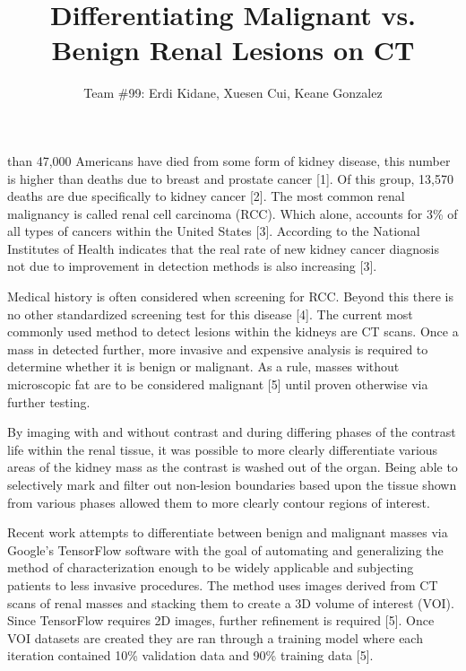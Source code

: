 \documentclass[10pt,journal,compsoc]{IEEEtran}
\begin{document}
\title{Differentiating Malignant vs. Benign Renal Lesions on CT}  %

\author{Team \#99: Erdi Kidane,
                Xuesen Cui,
                Keane Gonzalez}  %

\maketitle


\IEEEPARstartMore than 47,000 Americans have died from some form of kidney disease, this number is higher than deaths due to breast and prostate cancer [1]. Of this group, 13,570 deaths are due specifically to kidney cancer [2].  The most common renal malignancy is called renal cell carcinoma (RCC).  Which alone, accounts for 3\% of all types of cancers within the United States [3]. According to the National Institutes of Health indicates that the real rate of new kidney cancer diagnosis not due to improvement in detection methods is also increasing [3].   

Medical history is often considered when screening for RCC.  Beyond this there is no other standardized screening test for this disease [4].  The current most commonly used method to detect lesions within the kidneys are CT scans.  Once a mass in detected further, more invasive and expensive analysis is required to determine whether it is benign or malignant.  As a rule, masses without microscopic fat are to be considered malignant [5] until proven otherwise via further testing. 

By imaging with and without contrast and during differing phases of the contrast life within the renal tissue, it was possible to more clearly differentiate various areas of the kidney mass as the contrast is washed out of the organ. Being able to selectively mark and filter out non-lesion boundaries based upon the tissue shown from various phases allowed them to more clearly contour regions of interest.

Recent work attempts to differentiate between benign and malignant masses via Google’s TensorFlow software with the goal of automating and generalizing the method of characterization enough to be widely applicable and subjecting patients to less invasive procedures.   The method uses images derived from CT scans of renal masses and stacking them to create a 3D volume of interest (VOI).  Since TensorFlow requires 2D images, further refinement is required [5]. Once VOI datasets are created they are ran through a training model where each iteration contained 10\% validation data and 90\% training data [5].  
\end{document}
